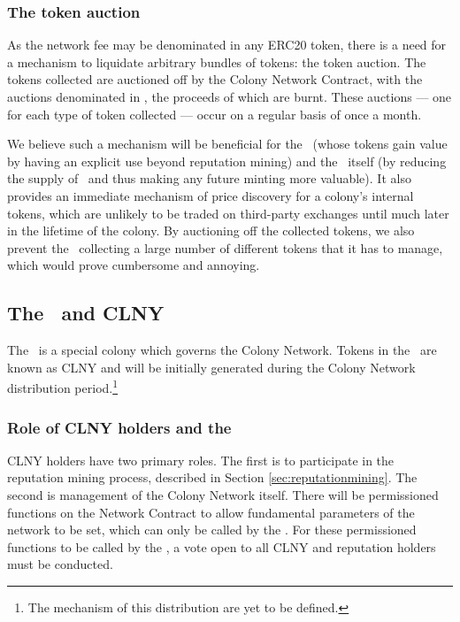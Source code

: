 \subsubsection{The token auction}

As the network fee may be denominated in any ERC20 token, there is a need for a mechanism to liquidate arbitrary bundles of tokens: the token auction. The tokens collected are auctioned off by the Colony Network Contract, with the auctions denominated in \rcts, the proceeds of which are burnt. These auctions --- one for each type of token collected --- occur on a regular basis of once a month.

We believe such a mechanism will be beneficial for the \rcths\ (whose tokens gain value by having an explicit use beyond reputation mining) and the \rc\ itself (by reducing the supply of \rcts\ and thus making any future minting more valuable). It also provides an immediate mechanism of price discovery for a colony's internal tokens, which are unlikely to be traded on third-party exchanges until much later in the lifetime of the colony. By auctioning off the collected tokens, we also prevent the \rc\ collecting a large number of different tokens that it has to manage, which would prove cumbersome and annoying.

\subsection{The \rc\ and CLNY}\label{sec:clny}

The \rc\ is a special colony which governs the Colony Network. Tokens in the \rc\ are known as CLNY and will be initially generated during the Colony Network distribution period.\footnote{The mechanism of this distribution are yet to be defined.}

\subsubsection{Role of CLNY holders and the \rc}

CLNY holders have two primary roles. The first is to participate in the reputation mining process, described in Section \ref{sec:reputationmining}. The second is management of the Colony Network itself. There will be permissioned functions on the Network Contract to allow fundamental parameters of the network to be set, which can only be called by the \rc. For these permissioned functions to be called by the \rc, a vote open to all CLNY and reputation holders must be conducted.

